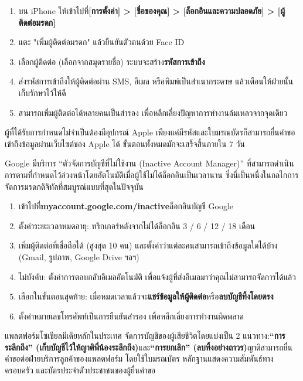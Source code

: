 \begin{enumerate}
  \item บน iPhone ให้เข้าไปที่\textbf{[การตั้งค่า] > [ชื่อของคุณ] > [ล็อกอินและความปลอดภัย] > [ผู้ติดต่อมรดก]}
  \item แตะ "เพิ่มผู้ติดต่อมรดก" แล้วยืนยันตัวตนด้วย Face ID
  \item เลือกผู้ติดต่อ (เลือกจากสมุดรายชื่อ) ระบบจะสร้าง\textbf{รหัสการเข้าถึง}
  \item ส่งรหัสการเข้าถึงให้ผู้ติดต่อผ่าน SMS, อีเมล หรือพิมพ์เป็นสำเนากระดาษ แล้วเตือนให้ฝ่ายนั้นเก็บรักษาไว้ให้ดี
  \item สามารถเพิ่มผู้ติดต่อได้หลายคนเป็นสำรอง เพื่อหลีกเลี่ยงปัญหาการทำงานล้มเหลวจากจุดเดียว
\end{enumerate}

ผู้ที่ได้รับการกำหนดไม่จำเป็นต้องมีอุปกรณ์ Apple เพียงแค่มีรหัสและใบมรณบัตรก็สามารถยื่นคำขอเข้าถึงข้อมูลผ่านเว็บไซต์ของ Apple ได้ ขั้นตอนทั้งหมดมักจะเสร็จสิ้นภายใน 7 วัน


Google มีบริการ “ตัวจัดการบัญชีที่ไม่ใช้งาน (Inactive Account Manager)” ที่สามารถดำเนินการตามที่กำหนดไว้ล่วงหน้าโดยอัตโนมัติเมื่อผู้ใช้ไม่ได้ล็อกอินเป็นเวลานาน ซึ่งนี่เป็นหนึ่งในกลไกการจัดการมรดกดิจิทัลที่สมบูรณ์แบบที่สุดในปัจจุบัน

\begin{enumerate}
  \item เข้าไปที่\textbf{myaccount.google.com/inactive}ล็อกอินบัญชี Google
  \item ตั้งค่าระยะเวลาหมดอายุ: ทริกเกอร์หลังจากไม่ได้ล็อกอิน 3 / 6 / 12 / 18 เดือน
  \item เพิ่มผู้ติดต่อที่เชื่อถือได้ (สูงสุด 10 คน) และตั้งค่าว่าแต่ละคนสามารถเข้าถึงข้อมูลใดได้บ้าง (Gmail, รูปภาพ, Google Drive ฯลฯ)
  \item ไม่บังคับ: ตั้งค่าการตอบกลับอีเมลอัตโนมัติ เพื่อแจ้งผู้ที่ส่งอีเมลมาว่าคุณไม่สามารถจัดการได้แล้ว
  \item เลือกในขั้นตอนสุดท้าย: เมื่อหมดเวลาแล้วจะ\textbf{แชร์ข้อมูลให้ผู้ติดต่อ}หรือ\textbf{ลบบัญชีทิ้งโดยตรง}
  \item ตั้งค่าหมายเลขโทรศัพท์เป็นการยืนยันสำรอง เพื่อหลีกเลี่ยงการทำงานผิดพลาด
\end{enumerate}


แพลตฟอร์มโซเชียลมีเดียหลักในประเทศ จัดการบัญชีของผู้เสียชีวิตโดยแบ่งเป็น 2 แนวทาง:\textbf{“การระลึกถึง” (เก็บบัญชีไว้ให้ญาติพี่น้องระลึกถึง)}และ\textbf{“การยกเลิก” (ลบทิ้งอย่างถาวร)}ญาติสามารถยื่นคำขอต่อฝ่ายบริการลูกค้าของแพลตฟอร์ม โดยใช้ใบมรณบัตร หลักฐานแสดงความสัมพันธ์ทางครอบครัว และบัตรประจำตัวประชาชนของผู้ยื่นคำขอ

